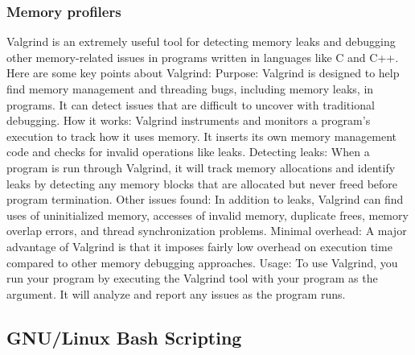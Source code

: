 \documentclass [ titlepage ]{article}
\begin{document}
\subsubsection{Memory profilers}
Valgrind is an extremely useful tool for detecting memory leaks and debugging other memory-related issues in programs written in languages
 like C and C++. Here are some key points about Valgrind: \newline
Purpose: Valgrind is designed to help find memory management and threading bugs, including memory leaks, in programs. It can detect
 issues that are difficult to uncover with traditional debugging.\newline
How it works: Valgrind instruments and monitors a program's execution to track how it uses memory. It inserts its own memory management
 code and checks for invalid operations like leaks. \newline
Detecting leaks: When a program is run through Valgrind, it will track memory allocations and identify leaks by detecting any memory blocks
 that are allocated but never freed before program termination. \newline
Other issues found: In addition to leaks, Valgrind can find uses of uninitialized memory, accesses of invalid memory, duplicate frees, memory
 overlap errors, and thread synchronization problems. \newline
Minimal overhead: A major advantage of Valgrind is that it imposes fairly low overhead on execution time compared to other memory
 debugging approaches. \newline
Usage: To use Valgrind, you run your program by executing the Valgrind tool with your program as the argument. It will analyze and report any
 issues as the program runs. \newline


\subsection{GNU/Linux Bash Scripting}
\end{document}
